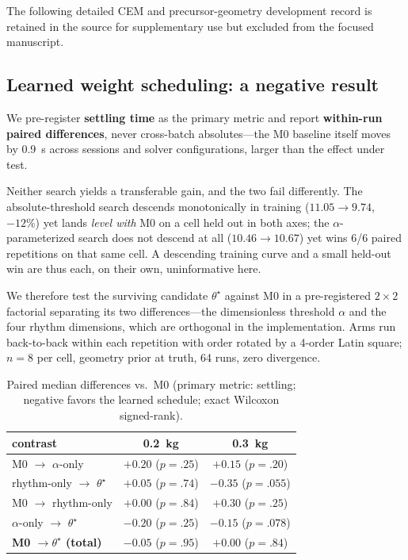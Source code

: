 
\iffalse
The following detailed CEM and precursor-geometry development record is retained in the source
for supplementary use but excluded from the focused manuscript.
\subsection{Learned weight scheduling: a negative result}
We pre-register \textbf{settling time} as the primary metric and report \textbf{within-run
paired differences}, never cross-batch absolutes---the M0 baseline itself moves by \SI{0.9}{s}
across sessions and solver configurations, larger than the effect under test.

Neither search yields a transferable gain, and the two fail differently. The absolute-threshold
search descends monotonically in training ($11.05 \rightarrow 9.74$, $-12\%$) yet lands
\emph{level with} M0 on a cell held out in both axes; the $\alpha$-parameterized search does not
descend at all ($10.46 \rightarrow 10.67$) yet wins 6/6 paired repetitions on that same cell.
A descending training curve and a small held-out win are thus each, on their own, uninformative
here.

We therefore test the surviving candidate $\theta^\star$ against M0 in a pre-registered
$2\times2$ factorial separating its two differences---the dimensionless threshold $\alpha$ and
the four rhythm dimensions, which are orthogonal in the implementation. Arms run back-to-back
within each repetition with order rotated by a 4-order Latin square; $n=8$ per cell, geometry
prior at truth, 64 runs, zero divergence.

\begin{table}[tb]
\caption{Paired median differences vs.\ M0 (primary metric: settling; negative favors the
learned schedule; exact Wilcoxon signed-rank).}
\label{tab:learn}
\centering
\begin{tabular}{@{}lcc@{}}
\toprule
contrast & \SI{0.2}{kg} & \SI{0.3}{kg} \\
\midrule
M0 $\rightarrow$ $\alpha$-only & $+0.20$ ($p=.25$) & $+0.15$ ($p=.20$) \\
rhythm-only $\rightarrow$ $\theta^\star$ & $+0.05$ ($p=.74$) & $-0.35$ ($p=.055$) \\
M0 $\rightarrow$ rhythm-only & $+0.00$ ($p=.84$) & $+0.30$ ($p=.25$) \\
$\alpha$-only $\rightarrow$ $\theta^\star$ & $-0.20$ ($p=.25$) & $-0.15$ ($p=.078$) \\
\midrule
\textbf{M0 $\rightarrow \theta^\star$ (total)} & $\mathbf{-0.05}$ ($p=.95$) &
$\mathbf{+0.00}$ ($p=.84$) \\
\bottomrule
\end{tabular}
\end{table}

